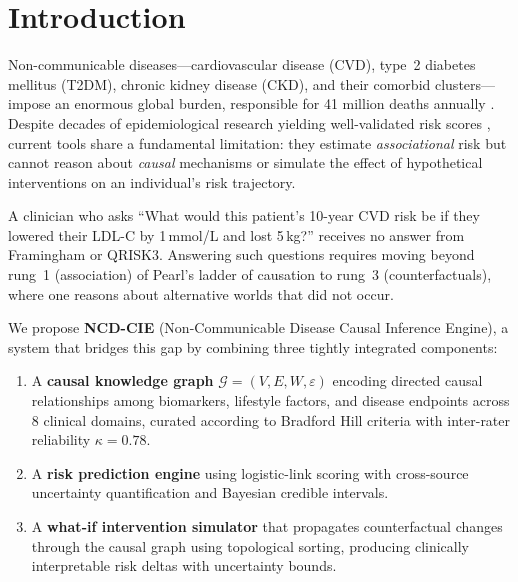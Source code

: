\documentclass[runningheads]{llncs}
\begin{document}
\section{Introduction}\label{sec:intro}

Non-communicable diseases---cardiovascular disease (CVD), type~2
diabetes mellitus (T2DM), chronic kidney disease (CKD), and their
comorbid clusters---impose an enormous global burden, responsible for
41 million deaths annually \cite{who2021ncd}.  Despite decades of
epidemiological research yielding well-validated risk scores
\cite{dagostino2008framingham, hippisley2017qrisk3, score22021},
current tools share a fundamental limitation: they estimate
\emph{associational} risk but cannot reason about \emph{causal}
mechanisms or simulate the effect of hypothetical interventions on an
individual's risk trajectory.

A clinician who asks ``What would this patient's 10-year CVD risk be
if they lowered their LDL-C by 1\,mmol/L and lost 5\,kg?'' receives
no answer from Framingham or QRISK3.  Answering such questions
requires moving beyond rung~1 (association) of Pearl's ladder of
causation \cite{pearl2018book} to rung~3 (counterfactuals), where
one reasons about alternative worlds that did not occur.

We propose \textbf{NCD-CIE} (Non-Communicable Disease Causal Inference
Engine), a system that bridges this gap by combining three tightly
integrated components:
\begin{enumerate}
\item A \textbf{causal knowledge graph} $\mathcal{G}=(V,E,W,\varepsilon)$
  encoding directed causal relationships among biomarkers, lifestyle
  factors, and disease endpoints across 8 clinical domains, curated
  according to Bradford Hill criteria \cite{hill1965environment} with
  inter-rater reliability $\kappa=0.78$.
\item A \textbf{risk prediction engine} using logistic-link scoring with
  cross-source uncertainty quantification and Bayesian credible
  intervals.
\item A \textbf{what-if intervention simulator} that propagates
  counterfactual changes through the causal graph using topological
  sorting, producing clinically interpretable risk deltas with
  uncertainty bounds.
\end{enumerate}
\end{document}
